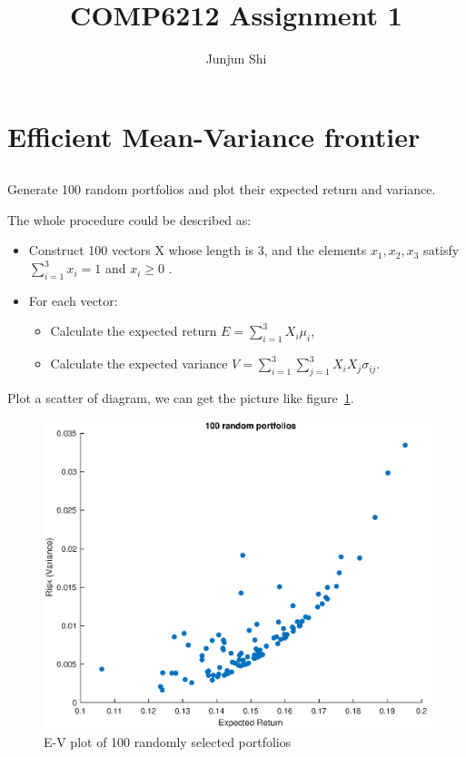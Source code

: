 \documentclass[a4paper, 12pt]{article}
\title{COMP6212 Assignment 1}
\author{Junjun Shi}
\begin{document}
    \maketitle

	\section{Efficient Mean-Variance frontier}

	\subsection{}
    
    Generate 100 random portfolios and plot their expected return and variance. 

    The whole procedure could be described as:
    \begin{itemize}
        \item Construct 100 vectors X whose length is 3, and the elements $x_1,x_2,x_3$ satisfy $\sum\limits_{i=1}^{3} x_i= 1$ and $x_i\geq 0$ .
		\item For each vector:
		\begin{itemize}
			\item Calculate the expected return $E = \sum_{i=1}^3 X_i \mu_i$,
		    \item Calculate the expected variance $V = \sum_{i=1}^3 \sum_{j=1}^3 X_i X_j \sigma_{ij}$.
		\end{itemize}
    \end{itemize}
	Plot a scatter of diagram, we can get the picture like figure~\ref{fig:q1_a}.
	
	\begin{figure}
		\begin{center}
			\includegraphics[width=0.85\linewidth]{q1_a.eps}
		\end{center}
		\caption{E-V plot of 100 randomly selected portfolios}
		\label{fig:q1_a}
	\end{figure}
	
\end{document}
